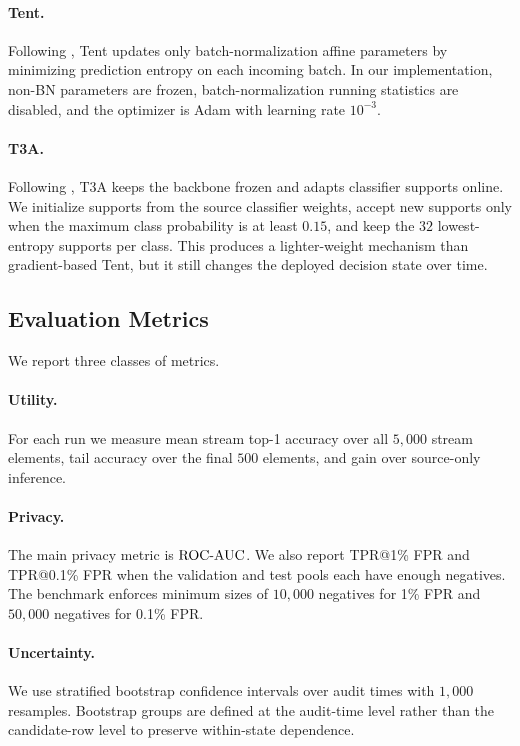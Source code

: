 \paragraph{Tent.}
Following \citet{wang2021tent}, Tent updates only batch-normalization affine parameters by minimizing prediction entropy on each incoming batch. In our implementation, non-BN parameters are frozen, batch-normalization running statistics are disabled, and the optimizer is Adam with learning rate $10^{-3}$.

\paragraph{T3A.}
Following \citet{iwasawa2021t3a}, T3A keeps the backbone frozen and adapts classifier supports online. We initialize supports from the source classifier weights, accept new supports only when the maximum class probability is at least $0.15$, and keep the $32$ lowest-entropy supports per class. This produces a lighter-weight mechanism than gradient-based Tent, but it still changes the deployed decision state over time.

\subsection{Evaluation Metrics}

We report three classes of metrics.

\paragraph{Utility.}
For each run we measure mean stream top-1 accuracy over all $5{,}000$ stream elements, tail accuracy over the final $500$ elements, and gain over source-only inference.

\paragraph{Privacy.}
The main privacy metric is $\mathrm{ROC\mbox{-}AUC}$. We also report TPR@1\% FPR and TPR@0.1\% FPR when the validation and test pools each have enough negatives. The benchmark enforces minimum sizes of $10{,}000$ negatives for 1\% FPR and $50{,}000$ negatives for 0.1\% FPR.

\paragraph{Uncertainty.}
We use stratified bootstrap confidence intervals over audit times with $1{,}000$ resamples. Bootstrap groups are defined at the audit-time level rather than the candidate-row level to preserve within-state dependence.

